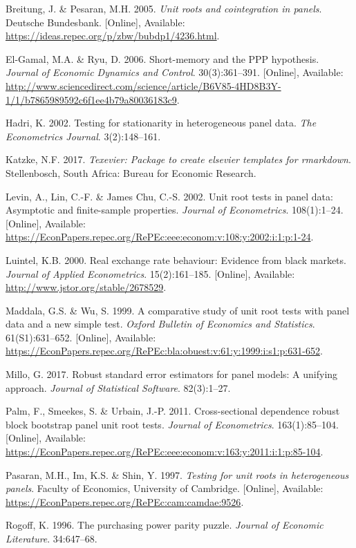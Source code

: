 \documentclass[11pt,preprint, authoryear]{elsarticle}
\numberwithin{equation}{section}
\numberwithin{figure}{section}
\numberwithin{table}{section}
\newlength{\cslhangindent}
\newenvironment{CSLReferences}%
  {\setlength{\parindent}{0pt}%
  \everypar{\setlength{\hangindent}{\cslhangindent}}\ignorespaces}%
  {\par}
\begin{document}
\hypertarget{refs}{}
\begin{CSLReferences}{1}{0}
\leavevmode\hypertarget{ref-pes}{}%
Breitung, J. \& Pesaran, M.H. 2005. \emph{Unit roots and cointegration
in panels}. Deutsche Bundesbank. {[}Online{]}, Available:
\url{https://ideas.repec.org/p/zbw/bubdp1/4236.html}.

\leavevmode\hypertarget{ref-puz}{}%
El-Gamal, M.A. \& Ryu, D. 2006. Short-memory and the PPP hypothesis.
\emph{Journal of Economic Dynamics and Control}. 30(3):361--391.
{[}Online{]}, Available:
\url{http://www.sciencedirect.com/science/article/B6V85-4HD8B3Y-1/1/b7865989592c6f1ee4b79a80036183c9}.

\leavevmode\hypertarget{ref-had}{}%
Hadri, K. 2002. Testing for stationarity in heterogeneous panel data.
\emph{The Econometrics Journal}. 3(2):148--161.

\leavevmode\hypertarget{ref-Texevier}{}%
Katzke, N.F. 2017. \emph{{Texevier}: {P}ackage to create elsevier
templates for rmarkdown}. Stellenbosch, South Africa: Bureau for
Economic Research.

\leavevmode\hypertarget{ref-lev}{}%
Levin, A., Lin, C.-F. \& James Chu, C.-S. 2002. Unit root tests in panel
data: Asymptotic and finite-sample properties. \emph{Journal of
Econometrics}. 108(1):1--24. {[}Online{]}, Available:
\url{https://EconPapers.repec.org/RePEc:eee:econom:v:108:y:2002:i:1:p:1-24}.

\leavevmode\hypertarget{ref-Kul}{}%
Luintel, K.B. 2000. Real exchange rate behaviour: Evidence from black
markets. \emph{Journal of Applied Econometrics}. 15(2):161--185.
{[}Online{]}, Available: \url{http://www.jstor.org/stable/2678529}.

\leavevmode\hypertarget{ref-wu}{}%
Maddala, G.S. \& Wu, S. 1999. A comparative study of unit root tests
with panel data and a new simple test. \emph{Oxford Bulletin of
Economics and Statistics}. 61(S1):631--652. {[}Online{]}, Available:
\url{https://EconPapers.repec.org/RePEc:bla:obuest:v:61:y:1999:i:s1:p:631-652}.

\leavevmode\hypertarget{ref-plm}{}%
Millo, G. 2017. Robust standard error estimators for panel models: A
unifying approach. \emph{Journal of Statistical Software}. 82(3):1--27.

\leavevmode\hypertarget{ref-pal}{}%
Palm, F., Smeekes, S. \& Urbain, J.-P. 2011. Cross-sectional dependence
robust block bootstrap panel unit root tests. \emph{Journal of
Econometrics}. 163(1):85--104. {[}Online{]}, Available:
\url{https://EconPapers.repec.org/RePEc:eee:econom:v:163:y:2011:i:1:p:85-104}.

\leavevmode\hypertarget{ref-im}{}%
Pasaran, M.H., Im, K.S. \& Shin, Y. 1997. \emph{Testing for unit roots
in heterogeneous panels}. Faculty of Economics, University of Cambridge.
{[}Online{]}, Available:
\url{https://EconPapers.repec.org/RePEc:cam:camdae:9526}.

\leavevmode\hypertarget{ref-rog}{}%
Rogoff, K. 1996. The purchasing power parity puzzle. \emph{Journal of
Economic Literature}. 34:647--68.

\end{CSLReferences}
\end{document}
